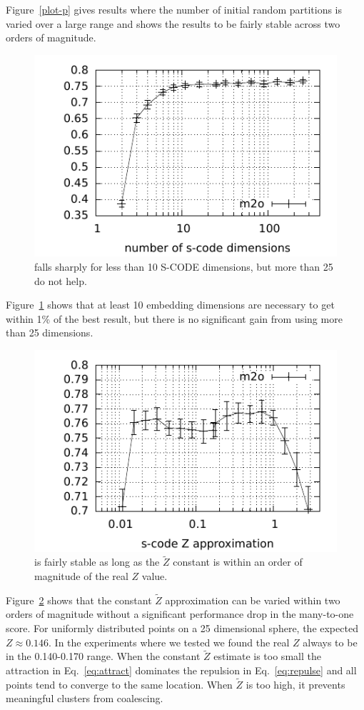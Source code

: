 Figure~\ref{plot-p} gives results where the number of initial random
partitions is varied over a large range and shows the results to be
fairly stable across two orders of magnitude.

\begin{figure}[ht] \centering
\includegraphics[width=0.5\linewidth]{plot-d.pdf}
\caption{\mto falls sharply for less than 10 S-CODE dimensions, but
  more than 25 do not help.}
\label{plot-d}
\end{figure}

Figure~\ref{plot-d} shows that at least 10 embedding dimensions are
necessary to get within 1\% of the best result, but there is no
significant gain from using more than 25 dimensions.

\begin{figure}[ht] \centering
\includegraphics[width=0.5\linewidth]{plot-z.pdf}
\caption{\mto is fairly stable as long as the $\tilde{Z}$ constant is
  within an order of magnitude of the real $Z$ value.}
\label{plot-z}
\end{figure}

Figure~\ref{plot-z} shows that the constant $\tilde{Z}$ approximation
can be varied within two orders of magnitude without a significant
performance drop in the many-to-one score.  For uniformly distributed
points on a 25 dimensional sphere, the expected $Z\approx 0.146$.  In
the experiments where we tested we found the real $Z$ always to be in
the 0.140-0.170 range.  When the constant $\tilde{Z}$ estimate is too
small the attraction in Eq.~\ref{eq:attract} dominates the repulsion
in Eq.~\ref{eq:repulse} and all points tend to converge to the same
location.  When $\tilde{Z}$ is too high, it prevents meaningful
clusters from coalescing.

